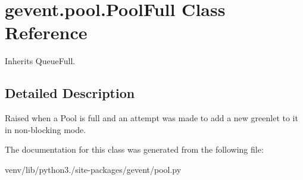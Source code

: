 \hypertarget{classgevent_1_1pool_1_1_pool_full}{}\section{gevent.\+pool.\+Pool\+Full Class Reference}
\label{classgevent_1_1pool_1_1_pool_full}


Inherits Queue\+Full.



\subsection{Detailed Description}
\begin{DoxyVerb}Raised when a Pool is full and an attempt was made to
add a new greenlet to it in non-blocking mode.
\end{DoxyVerb}
 

The documentation for this class was generated from the following file\+:\begin{DoxyCompactItemize}
\item 
venv/lib/python3./site-\/packages/gevent/pool.\+py\end{DoxyCompactItemize}
